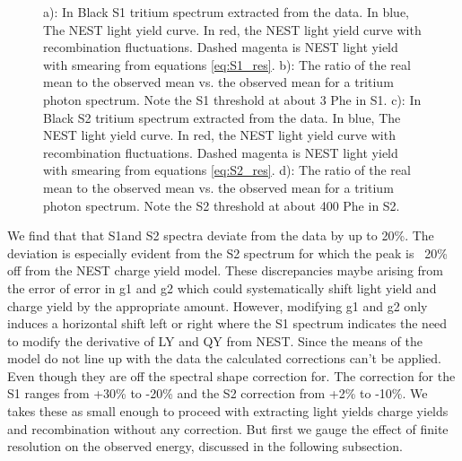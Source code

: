 \begin{figure}[h!]
\caption{ a): In Black S1 tritium spectrum extracted from the data. In blue, The NEST light yield curve. In red, the NEST light yield curve with recombination fluctuations. Dashed magenta is NEST light yield with smearing from equations \ref{eq:S1_res}.  b): The ratio of the real mean to the observed mean vs. the observed mean for a tritium photon spectrum. Note the S1 threshold at about 3 Phe in S1. c): In Black S2 tritium spectrum extracted from the data. In blue, The NEST light yield curve. In red, the NEST light yield curve with recombination fluctuations. Dashed magenta is NEST light yield with smearing from equations \ref{eq:S2_res}.  d): The ratio of the real mean to the observed mean vs. the observed mean for a tritium photon spectrum. Note the S2 threshold at about 400 Phe in S2. }

\label{fig:S1S2_mapping}
\end{figure}
\renewcommand{\baselinestretch}{2}
\small\normalsize


We find that that S1and S2 spectra deviate from the data by up to 20\%. The deviation is especially evident from the S2 spectrum for which the peak is ~20\% off from the NEST charge yield model. These discrepancies maybe arising from the error of error in g1 and g2 which could systematically shift light yield and charge yield by the appropriate amount. However, modifying g1 and g2 only induces a horizontal shift left or right where the S1 spectrum indicates the need to modify the derivative of LY and QY from NEST. 
Since the means of the model do not line up with the data the calculated corrections can't be applied. Even though they are off the spectral shape correction for. The correction for the S1 ranges from +30\% to -20\% and the S2 correction from +2\% to -10\%. We takes these as small enough to proceed with extracting light yields charge yields and recombination without any correction. But first we gauge the effect of finite resolution on the observed energy, discussed in the following subsection. %



